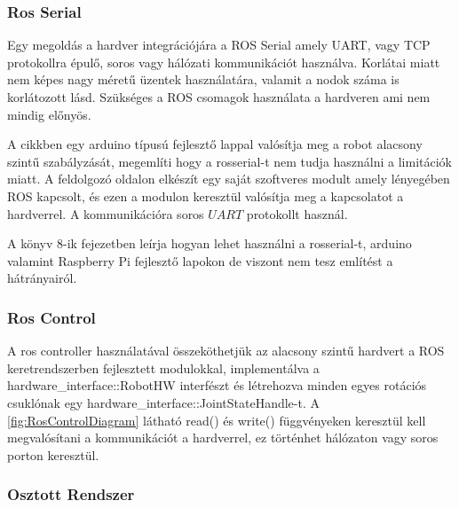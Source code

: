 \subsubsection*{Ros Serial}
Egy megoldás a hardver integrációjára a ROS Serial amely UART, vagy TCP protokollra épulő, soros vagy hálózati kommunikációt használva. Korlátai miatt \cite{RosSerial} nem képes nagy méretű üzentek használatára, valamit a nodok száma is korlátozott lásd. Szükséges a ROS csomagok használata a hardveren ami nem mindig előnyös.

A \cite{ROSArduino2013} cikkben egy arduino típusú fejlesztő lappal valósítja meg a robot alacsony szintű szabályzását, megemlíti hogy a rosserial-t nem tudja használni a limitációk miatt. A feldolgozó oldalon elkészít egy saját szoftveres modult amely lényegében ROS kapcsolt, és ezen a modulon keresztül valósítja meg a kapcsolatot a hardverrel. A kommunikációra soros $UART$ protokollt használ.

A \cite{ROSRoboticsByExampleSecEd} könyv 8-ik fejezetben leírja hogyan lehet használni a rosserial-t, arduino valamint Raspberry Pi fejlesztő lapokon de viszont nem tesz említést a hátrányairól.

\subsubsection*{Ros Control}

A ros controller  \cite{roscontrol} használatával összeköthetjük az alacsony szintű hardvert a ROS keretrendszerben fejlesztett modulokkal, implementálva \cite{ROSControlExample} a hardware\_interface::RobotHW interfészt és létrehozva minden egyes rotációs csuklónak egy \newline hardware\_interface::JointStateHandle-t. A \ref{fig:RosControlDiagram} látható read() és write() függvényeken keresztül kell megvalósítani a kommunikációt a hardverrel, ez történhet hálózaton vagy soros porton keresztül.

\renewcommand{\img}{AktualisTudomany/roscontrol.png}
\renewcommand{\sources}{Forrás: https://www.army-technology.com}
\renewcommand{\captionn}{Ros Control modulok}
\renewcommand{\figlabel}{RosControlDiagram}


\subsubsection*{Osztott Rendszer}

